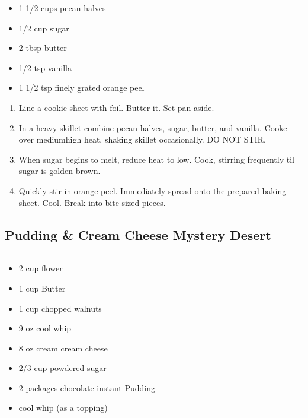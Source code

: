 \documentclass{article}
\begin{document}
\begin{framed}
    \begin{itemize}
        \item 1 1/2 cups pecan halves
        \item 1/2 cup sugar
        \item 2 tbsp butter
        \item 1/2 tsp vanilla
        \item 1 1/2 tsp finely grated orange peel
    \end{itemize}
\end{framed}

\begin{enumerate}
    \item 
        Line a cookie sheet with foil. Butter it. Set pan aside.
    \item  
        In a heavy skillet combine pecan halves, sugar, butter, and vanilla. Cooke over mediumhigh heat, shaking skillet occasionally. DO NOT STIR.
    \item 
        When sugar begins to melt, reduce heat to low. Cook, stirring frequently til sugar is golden brown. 
    \item 
        Quickly stir in orange peel. Immediately spread onto the prepared baking sheet. Cool. Break into bite sized pieces.
\end{enumerate}
\newpage

\subsection{Pudding \& Cream Cheese Mystery Desert} 
\noindent\rule[0.5ex]{\linewidth}{1pt}

\begin{framed}
    \begin{itemize}
        \item 2 cup flower 
        \item 1 cup Butter
        \item 1 cup chopped walnuts
        \item 9 oz cool whip
        \item 8 oz cream cream cheese 
        \item 2/3 cup powdered sugar
        \item 2 packages chocolate instant Pudding
        \item cool whip (as a topping)
    \end{itemize}
\end{framed}
\end{document}
